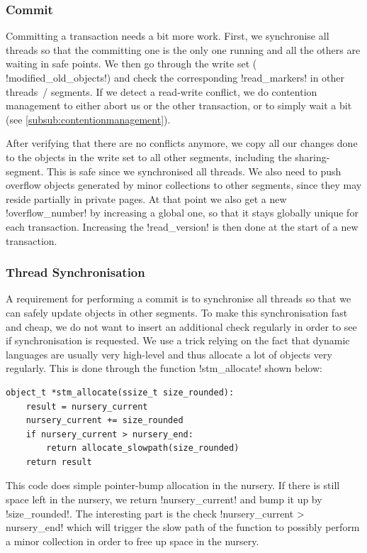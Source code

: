 \documentclass{sigplanconf}
\makeatletter
\renewcommand\lstinline[1][]{%
  \Collectverb{\@@myverb}%
}
\def\@@myverb#1{%
    \begingroup
    \fboxsep=0.2em
    \colorbox{verylightgray}{\oldlstinline|#1|}%
    \endgroup
}
\makeatother
\begin{document}
\subsubsection{Commit}

Committing a transaction needs a bit more work. First, we synchronise
all threads so that the committing one is the only one running and all
the others are waiting in safe points. We then go through the write
set (\lstinline!modified_old_objects!)  and check the corresponding
\lstinline!read_markers!  in other threads~/ segments. If we detect a
read-write conflict, we do contention management to either abort us or
the other transaction, or to simply wait a bit (see \ref{subsub:contentionmanagement}).

After verifying that there are no conflicts anymore, we copy all our
changes done to the objects in the write set to all other segments,
including the sharing-segment. This is safe since we synchronised all
threads. We also need to push overflow objects generated by minor
collections to other segments, since they may reside partially in
private pages. At that point we also get a new
\lstinline!overflow_number! by increasing a global one, so that it
stays globally unique for each transaction. Increasing the
\lstinline!read_version!  is then done at the start of a new
transaction.



\subsubsection{Thread Synchronisation}

A requirement for performing a commit is to synchronise all threads so
that we can safely update objects in other segments. To make this
synchronisation fast and cheap, we do not want to insert an additional
check regularly in order to see if synchronisation is requested. We
use a trick relying on the fact that dynamic languages are usually
very high-level and thus allocate a lot of objects very regularly.
This is done through the function \lstinline!stm_allocate!  shown
below:

\begin{lstlisting}
object_t *stm_allocate(ssize_t size_rounded):
    result = nursery_current
	nursery_current += size_rounded
	if nursery_current > nursery_end:
		return allocate_slowpath(size_rounded)
	return result
\end{lstlisting}


This code does simple pointer-bump allocation in the nursery. If there
is still space left in the nursery, we return
\lstinline!nursery_current!  and bump it up by
\lstinline!size_rounded!.  The interesting part is the check
\lstinline!nursery_current > nursery_end!  which will trigger the slow
path of the function to possibly perform a minor collection in order
to free up space in the nursery.
\end{document}
